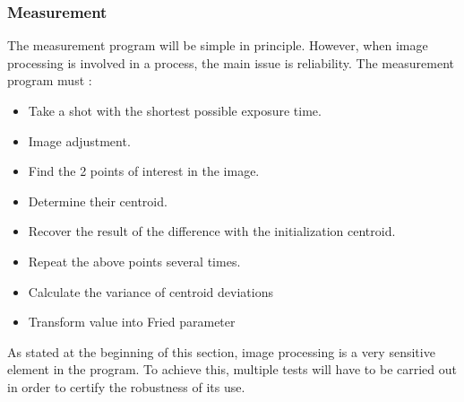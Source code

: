 \subsubsection{Measurement}
The measurement program will be simple in principle. However, when image processing is involved in a process, the main issue is reliability.
The measurement program must :
\begin{itemize}
    \item Take a shot with the shortest possible exposure time.
    \item Image adjustment.
    \item Find the 2 points of interest in the image.
    \item Determine their centroid.
    \item Recover the result of the difference with the initialization centroid.
    \item Repeat the above points several times.
    \item Calculate the variance of centroid deviations
    \item Transform value into Fried parameter
\end{itemize}
As stated at the beginning of this section, image processing is a very sensitive element in the program. To achieve this,
multiple tests will have to be carried out in order to certify the robustness of its use.
\newpage
